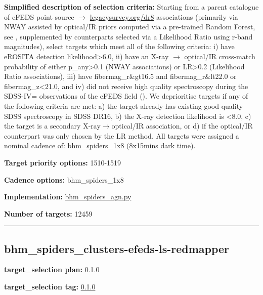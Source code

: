 \noindent\textbf{Simplified description of selection criteria:} Starting from a
parent catalogue of eFEDS point source $\rightarrow$
\href{https://www.legacysurvey.org/dr8}{legacysurvey.org/dr8}
associations (primarily via NWAY assisted by optical/IR priors computed
via a pre-trained Random Forest, see
\citealt{Salvato2022}, supplemented by counterparts selected via a Likelihood
Ratio using r-band magnitudes), select targets which meet all of the
following criteria: i) have eROSITA detection likelihood\textgreater6.0,
ii) have an X-ray $\rightarrow$ optical/IR cross-match probability of either
p\_any\textgreater0.1 (NWAY associations) or LR\textgreater0.2
(Likelihood Ratio associations), iii) have fibermag\_r\&gt16.5 and
fibermag\_r\&lt22.0 or fibermag\_z\textless21.0, and iv) did not receive
high quality spectroscopy during the SDSS-IV= observations of the eFEDS
field
(\citealt{Abdurrouf_2021_sdssDR17}). We deprioritise targets if any of the following criteria
are met: a) the target already has existing good quality SDSS
spectroscopy in SDSS DR16, b) the X-ray detection likelihood is
\textless8.0, c) the target is a secondary X-ray$\rightarrow$optical/IR association,
or d) if the optical/IR counterpart was only chosen by the LR method.
All targets were assigned a nominal cadence of: bhm\_spiders\_1x8
(8x15mins dark time).


\noindent\textbf{Target priority options:} 1510-1519

\noindent\textbf{Cadence options:} bhm\_spiders\_1x8

\noindent\textbf{Implementation:}
\href{https://github.com/sdss/target_selection/blob/0.1.0/python/target_selection/cartons/bhm_spiders_agn.py}{bhm\_spiders\_agn.py}

\noindent\textbf{Number of targets:} 12459

\begin{center}\rule{0.5\linewidth}{0.5pt}\end{center}

\hypertarget{bhm_spiders_clusters-efeds-ls-redmapper_plan0.1.0}{%
\subsection{bhm\_spiders\_clusters-efeds-ls-redmapper}\label{bhm_spiders_clusters-efeds-ls-redmapper_plan0.1.0}}

\noindent\textbf{target\_selection plan:} 0.1.0

\noindent\textbf{target\_selection tag:}
\href{https://github.com/sdss/target_selection/tree/0.1.0/}{0.1.0}

